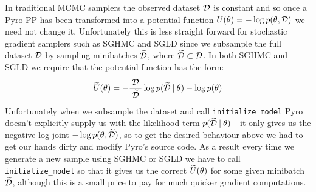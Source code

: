 In traditional MCMC samplers the observed dataset $\mathcal{D}$ is constant and so once a Pyro PP has been transformed into a potential function $U(\theta) = - \log p(\theta, \mathcal{D})$ we need not change it. Unfortunately this is less straight forward for stochastic gradient samplers such as SGHMC and SGLD since we subsample the full dataset $\mathcal{D}$ by sampling minibatches $\widetilde{\mathcal{D}}$, where $\widetilde{\mathcal{D}} \subset \mathcal{D}$. In both SGHMC and SGLD we require that the potential function has the form:
$$\widetilde{U}(\theta) =  -\frac{|\mathcal{D}|}{|\widetilde{\mathcal{D}}|} \log p(\widetilde{\mathcal{D}} \: | \: \theta) - \log p (\theta)$$
Unfortunately when we subsample the dataset and call \texttt{initialize\_model} Pyro doesn't explicitly supply us with the likelihood term $p(\widetilde{\mathcal{D}} \: | \: \theta)$ - it only gives us the negative log joint $- \log p(\theta, \widetilde{\mathcal{D}})$, so to get the desired behaviour above we had to get our hands dirty and modify Pyro's source code. As a result every time we generate a new sample using SGHMC or SGLD we have to call \texttt{initialize\_model} so that it gives us the correct $\widetilde{U}(\theta)$ for some given minibatch $\widetilde{\mathcal{D}}$, although this is a small price to pay for much quicker gradient computations.
